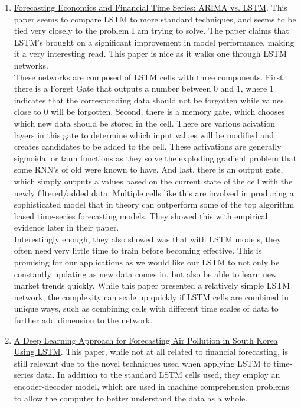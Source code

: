 \documentclass{article}
\begin{document}
\begin{enumerate}
\item \href{https://arxiv.org/abs/1803.06386}{Forecasting Economics and Financial Time Series: ARIMA vs. LSTM}. This paper seems to compare LSTM to more standard techniques, and seems to be tied very closely to the problem I am trying to solve. The paper claims that LSTM's brought on a significant improvement in model performance, making it a very interesting read. This paper is nice as it walks one through LSTM networks. \\\newline These networks are composed of LSTM cells with three components. First, there is a Forget Gate that outputs a number between 0 and 1, where 1 indicates that the corresponding data should not be forgotten while values close to 0 will be forgotten. Second, there is a memory gate, which chooses which new data should be stored in the cell. There are various acivation layers in this gate to determine which input values will be modified and creates candidates to be added to the cell. These activations are generally sigmoidal or tanh functions as they solve the exploding gradient problem that some RNN's of old were known to have. And last, there is an output gate, which simply outputs a values based on the current state of the cell with the newly filtered/added data. Multiple cells like this are involved in producing a sophisticated model that in theory can outperform some of the top algorithm based time-series forecasting models. They showed this with empirical evidence later in their paper. \\\newline 
Interestingly enough, they also showed was that with LSTM models, they often need very little time to train before becoming effective. This is promising for our applications as we would like our LSTM to not only be constantly updating as new data comes in, but also be able to learn new market trends quickly. While this paper presented a relatively simple LSTM network, the complexity can scale up quickly if LSTM cells are combined in unique ways, such as combining cells with different time scales of data to further add dimension to the network.
\item \href{https://arxiv.org/abs/1804.07891}{A Deep Learning Approach for Forecasting Air Pollution in South Korea Using LSTM}. This paper, while not at all related to financial forecasting, is still relevant due to the novel techniques used when applying LSTM to time-series data. In addition to the standard LSTM cells used, they employ an encoder-decoder model, which are used in machine comprehension problems to allow the computer to better understand the data as a whole. \\\newline 

\end{enumerate}
\end{document}
